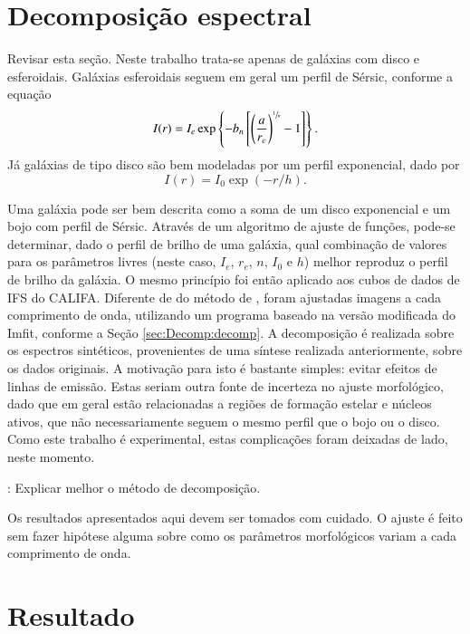 \section{Decomposição espectral}

\TODO Revisar esta seção. Neste trabalho trata-se apenas de galáxias com disco e
esferoidais.
Galáxias esferoidais seguem em geral um perfil de Sérsic, conforme a equação
\begin{equation*}
I(r) = I_e \exp \left\{- b_n \left[ \left( \frac{a}{r_e} \right)^{\sfrac{1}{n}}
- 1 \right] \right\}.
\end{equation*}
Já galáxias de tipo disco são bem modeladas por um perfil exponencial, dado por
\begin{equation*}
I(r) = I_0 \exp \left(- r / h \right).
\end{equation*}

Uma galáxia pode ser bem descrita como a soma de um disco exponencial e um bojo
com perfil de Sérsic. Através de um algoritmo de ajuste de funções, pode-se
determinar, dado o perfil de brilho de uma galáxia, qual combinação de valores
para os parâmetros livres (neste caso, $I_e$, $r_e$, $n$, $I_0$ e $h$) melhor
reproduz o perfil de brilho da galáxia.
O mesmo princípio foi então aplicado aos cubos de dados de IFS do CALIFA.
Diferente de do método de \citeauthor{Johnston2012}, foram ajustadas imagens a
cada comprimento de onda, utilizando um programa baseado na versão modificada do
Imfit, conforme a Seção \ref{sec:Decomp:decomp}. A decomposição é realizada
sobre os espectros sintéticos\fixme, provenientes de uma síntese realizada
anteriormente, sobre os dados originais. A motivação para isto é bastante
simples: evitar efeitos de linhas de emissão.
Estas seriam outra fonte de incerteza no ajuste morfológico, dado que em geral
estão relacionadas a regiões de formação estelar e núcleos ativos, que não
necessariamente seguem o mesmo perfil que o bojo ou o disco. Como este trabalho
é experimental, estas complicações foram deixadas de lado, neste momento.

\TODO: Explicar melhor o método de decomposição.

Os resultados apresentados aqui devem ser tomados com cuidado. O ajuste é feito
sem fazer hipótese alguma sobre como os parâmetros morfológicos variam a cada
comprimento de onda.



\section{Resultado}

